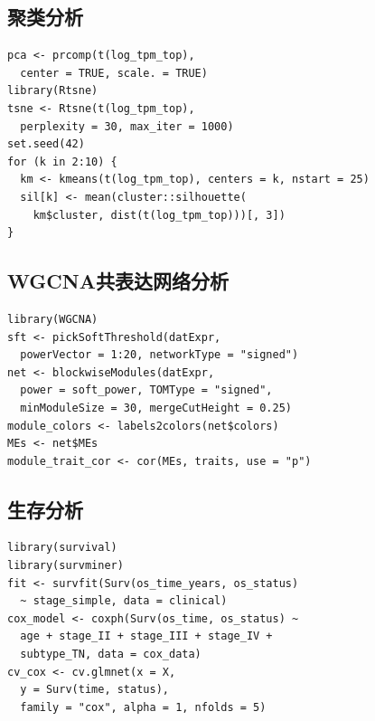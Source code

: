\documentclass[12pt,a4paper]{article}
\begin{document}
\subsection{聚类分析}

\begin{lstlisting}[caption={PCA、t-SNE与K-means}]
pca <- prcomp(t(log_tpm_top),
  center = TRUE, scale. = TRUE)
library(Rtsne)
tsne <- Rtsne(t(log_tpm_top),
  perplexity = 30, max_iter = 1000)
set.seed(42)
for (k in 2:10) {
  km <- kmeans(t(log_tpm_top), centers = k, nstart = 25)
  sil[k] <- mean(cluster::silhouette(
    km$cluster, dist(t(log_tpm_top)))[, 3])
}
\end{lstlisting}

\subsection{WGCNA共表达网络分析}

\begin{lstlisting}[caption={WGCNA网络构建}]
library(WGCNA)
sft <- pickSoftThreshold(datExpr,
  powerVector = 1:20, networkType = "signed")
net <- blockwiseModules(datExpr,
  power = soft_power, TOMType = "signed",
  minModuleSize = 30, mergeCutHeight = 0.25)
module_colors <- labels2colors(net$colors)
MEs <- net$MEs
module_trait_cor <- cor(MEs, traits, use = "p")
\end{lstlisting}

\subsection{生存分析}

\begin{lstlisting}[caption={KM曲线与Cox回归}]
library(survival)
library(survminer)
fit <- survfit(Surv(os_time_years, os_status)
  ~ stage_simple, data = clinical)
cox_model <- coxph(Surv(os_time, os_status) ~
  age + stage_II + stage_III + stage_IV +
  subtype_TN, data = cox_data)
cv_cox <- cv.glmnet(x = X,
  y = Surv(time, status),
  family = "cox", alpha = 1, nfolds = 5)
\end{lstlisting}
\end{document}
